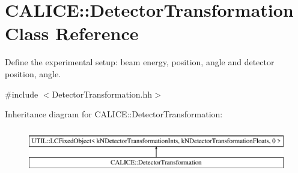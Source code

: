 \section{C\-A\-L\-I\-C\-E\-:\-:Detector\-Transformation Class Reference}
\label{classCALICE_1_1DetectorTransformation}


Define the experimental setup\-: beam energy, position, angle and detector position, angle.  




{\ttfamily \#include $<$Detector\-Transformation.\-hh$>$}

Inheritance diagram for C\-A\-L\-I\-C\-E\-:\-:Detector\-Transformation\-:\begin{figure}[H]
\begin{center}
\leavevmode
\includegraphics[height=2.000000cm]{classCALICE_1_1DetectorTransformation}
\end{center}
\end{figure}
